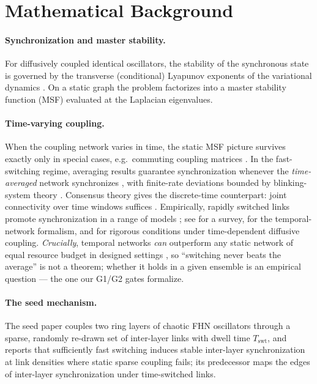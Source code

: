 \documentclass[11pt]{article}
\newcommand{\Tswt}{T_{\mathrm{swt}}}
\begin{document}
\section{Mathematical Background}
\label{sec:background}

\paragraph{Synchronization and master stability.}
For diffusively coupled identical oscillators, the stability of the
synchronous state is governed by the transverse (conditional) Lyapunov
exponents of the variational dynamics
\citep{pecora1990synchronization,pecora1998master}. On a static graph the
problem factorizes into a master stability function (MSF) evaluated at the
Laplacian eigenvalues.

\paragraph{Time-varying coupling.}
When the coupling network varies in time, the static MSF picture survives
exactly only in special cases, e.g.\ commuting coupling matrices
\citep{boccaletti2006commutative}. In the fast-switching regime, averaging
results guarantee synchronization whenever the \emph{time-averaged} network
synchronizes \citep{belykh2004blinking,stilwell2006sufficient}, with
finite-rate deviations bounded by blinking-system theory
\citep{hasler2013dynamics}. Consensus theory gives the discrete-time
counterpart: joint connectivity over time windows suffices
\citep{jadbabaie2003coordination,olfatisaber2004consensus,moreau2005stability,renbeard2005consensus}.
Empirically, rapidly switched links promote synchronization in a range of
models \citep{kohar2014synchronization,zhou2019random}; see
\citep{ghosh2022synchronized} for a survey, \citep{holme2012temporal} for the
temporal-network formalism, and \citep{jardon2024persistent} for rigorous
conditions under time-dependent diffusive coupling.
\emph{Crucially}, temporal networks \emph{can} outperform any static network of
equal resource budget in designed settings \citep{zhang2021designing}, so
``switching never beats the average'' is not a theorem; whether it holds in a
given ensemble is an empirical question --- the one our G1/G2 gates formalize.

\paragraph{The seed mechanism.}
The seed paper \citep{eser2025switching} couples two ring layers of chaotic
FHN oscillators through a sparse, randomly re-drawn set of inter-layer links
with dwell time $\Tswt$, and reports that sufficiently fast switching induces
stable inter-layer synchronization at link densities where static sparse
coupling fails; its predecessor \citep{eser2021edges} maps the edges of
inter-layer synchronization under time-switched links.
\end{document}
